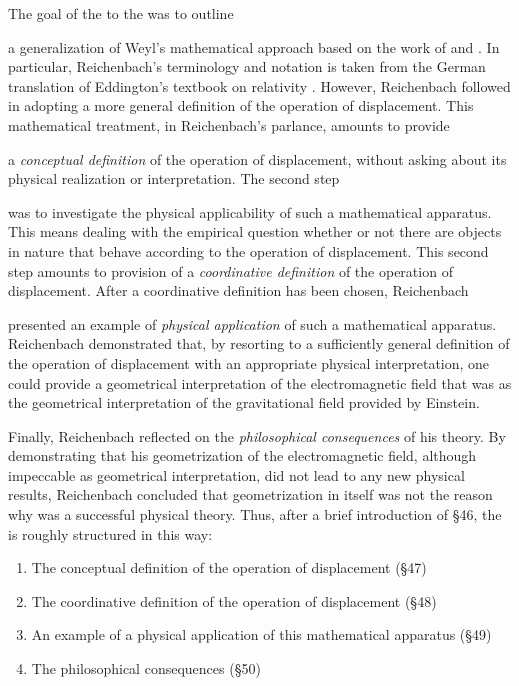 \documentclass[submitted]{article}
\newcommand{\PRZL}{\citetitle{Reichenbach1928}\xspace}
\begin{document}
\begin{inparaenum}[(1)] The goal of the \Ap to the \PRZL was to outline \item a generalization of Weyl's mathematical approach based on the work of \citet{Eddington1923} and \citet{Schouten1922}. In particular, Reichenbach's terminology and notation is taken from the German translation \citep{Eddington1925a} of Eddington's textbook on relativity \citep{Eddington1923}. However, Reichenbach followed \citet{Schouten1922} in adopting a more general definition of the operation of displacement. This mathematical treatment, in Reichenbach's parlance, amounts to provide \item a \emph{conceptual definition} of the operation of displacement, without asking about its physical realization or interpretation. The second step \item was to investigate the physical applicability of such a mathematical apparatus. This means dealing with the empirical question whether or not there are objects in nature that behave according to the operation of displacement. This second step amounts to provision of a \emph{coordinative definition} of the operation of displacement. After a coordinative definition has been chosen, Reichenbach \item presented an example of \emph{physical application} of such a mathematical apparatus. Reichenbach demonstrated that, by resorting to a sufficiently general definition of the operation of displacement with an appropriate physical interpretation, one could provide a geometrical interpretation of the electromagnetic field that was  as the geometrical interpretation of the gravitational field provided by Einstein. \item Finally, Reichenbach reflected on the \emph{philosophical consequences} of his theory. By demonstrating that his geometrization of the electromagnetic field, although impeccable as geometrical interpretation, did not lead to any new physical results, Reichenbach concluded that geometrization in itself was not the reason why \gr was a successful physical theory. Thus, after a brief introduction of \S46, the \Ap is roughly structured in this way: \end{inparaenum}

\begin{enumerate}
 \item The conceptual definition of the operation of displacement (\S47)
 \item The coordinative definition of the operation of displacement (\S 48)
 \item An example of a physical application of this mathematical apparatus (\S 49)
 \item The philosophical consequences (\S50)
\end{enumerate}
\end{document}
